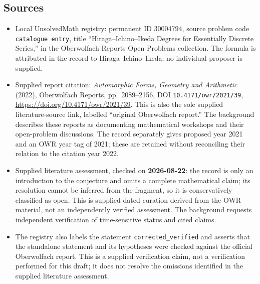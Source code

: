 \documentclass[11pt]{article}
\begin{document}
\subsection{Sources}
\begin{itemize}
\item Local UnsolvedMath registry: permanent ID $30004794$, source problem code \texttt{catalogue entry}, title ``Hiraga--Ichino--Ikeda Degrees for Essentially Discrete Series,'' in the Oberwolfach Reports Open Problems collection. The formula is attributed in the record to Hiraga--Ichino--Ikeda; no individual proposer is supplied.
\item Supplied report citation: \emph{Automorphic Forms, Geometry and Arithmetic} (2022), Oberwolfach Reports, pp.~2089--2156, DOI \texttt{10.4171/owr/2021/39}, \url{https://doi.org/10.4171/owr/2021/39}. This is also the sole supplied literature-source link, labelled ``original Oberwolfach report.'' The background describes these reports as documenting mathematical workshops and their open-problem discussions. The record separately gives proposed year 2021 and an OWR year tag of 2021; these are retained without reconciling their relation to the citation year 2022.
\item Supplied literature assessment, checked on \textbf{2026-08-22}: the record is only an introduction to the conjecture and omits a complete mathematical claim; its resolution cannot be inferred from the fragment, so it is conservatively classified as open. This is supplied dated curation derived from the OWR material, not an independently verified assessment. The background requests independent verification of time-sensitive status and cited claims.
\item The registry also labels the statement \texttt{corrected\_verified} and asserts that the standalone statement and its hypotheses were checked against the official Oberwolfach report. This is a supplied verification claim, not a verification performed for this draft; it does not resolve the omissions identified in the supplied literature assessment.
\end{itemize}
\end{document}
